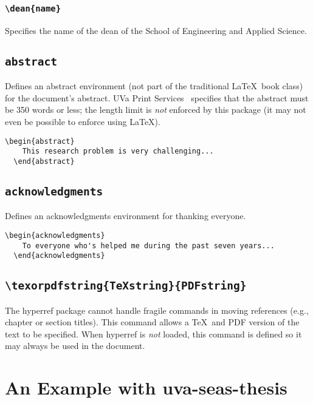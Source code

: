 \documentclass[10pt]{article}
\newcommand{\package}[1]{#1}
\newcommand{\environment}[1]{\texttt{#1}}
\newcommand{\command}[1]{\texttt{\textbackslash#1}}
\newcommand{\thispackage}{\package{uva-seas-thesis}}
\begin{document}
\subsubsection{\command{dean\{name\}}}
Specifies the name of the dean of the School of Engineering and Applied Science.

\subsection{\environment{abstract}}
Defines an abstract environment (not part of the traditional \LaTeX\ book class) for the document's abstract.
\Gls{UVa} Print Services~\cite{uvaprint:thesis} specifies that the abstract must be 350 words or less;
the length limit is \emph{not} enforced by this package (it may not even be possible to enforce using \LaTeX).

\begin{lstlisting}[gobble=2]
  \begin{abstract}
    This research problem is very challenging...
  \end{abstract}
\end{lstlisting}

\subsection{\environment{acknowledgments}}
Defines an acknowledgments environment for thanking everyone.

\begin{lstlisting}[gobble=2]
  \begin{acknowledgments}
    To everyone who's helped me during the past seven years...
  \end{acknowledgments}
\end{lstlisting}

\subsection{\command{texorpdfstring\{\TeX string\}\{PDFstring\}}}
The \package{hyperref} package cannot handle fragile commands in moving references (e.g., chapter or section titles).
This command allows a \TeX\ and PDF version of the text to be specified.
When \package{hyperref} is \emph{not} loaded, this command is defined so it may always be used in the document.

\section{An Example with \thispackage}\label{section:example}
\end{document}
